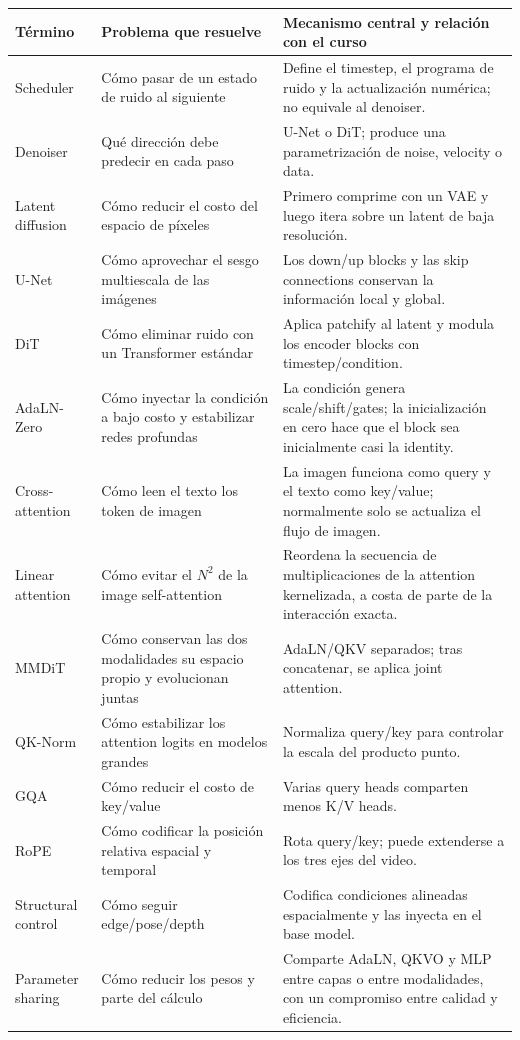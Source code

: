 \documentclass[a4paper]{article}
\begin{document}
\begin{center}
\small
\begin{tabularx}{\textwidth}{p{} X X}
\toprule
\textbf{Término} & \textbf{Problema que resuelve} & \textbf{Mecanismo central y relación con el curso} \\
\midrule
Scheduler & Cómo pasar de un estado de ruido al siguiente & Define el timestep, el programa de ruido y la actualización numérica; no equivale al denoiser. \\
Denoiser & Qué dirección debe predecir en cada paso & U-Net o DiT; produce una parametrización de noise, velocity o data. \\
Latent diffusion & Cómo reducir el costo del espacio de píxeles & Primero comprime con un VAE y luego itera sobre un latent de baja resolución. \\
U-Net & Cómo aprovechar el sesgo multiescala de las imágenes & Los down/up blocks y las skip connections conservan la información local y global. \\
DiT & Cómo eliminar ruido con un Transformer estándar & Aplica patchify al latent y modula los encoder blocks con timestep/condition. \\
AdaLN-Zero & Cómo inyectar la condición a bajo costo y estabilizar redes profundas & La condición genera scale/shift/gates; la inicialización en cero hace que el block sea inicialmente casi la identity. \\
Cross-attention & Cómo leen el texto los token de imagen & La imagen funciona como query y el texto como key/value; normalmente solo se actualiza el flujo de imagen. \\
Linear attention & Cómo evitar el $N^2$ de la image self-attention & Reordena la secuencia de multiplicaciones de la attention kernelizada, a costa de parte de la interacción exacta. \\
MMDiT & Cómo conservan las dos modalidades su espacio propio y evolucionan juntas & AdaLN/QKV separados; tras concatenar, se aplica joint attention. \\
QK-Norm & Cómo estabilizar los attention logits en modelos grandes & Normaliza query/key para controlar la escala del producto punto. \\
GQA & Cómo reducir el costo de key/value & Varias query heads comparten menos K/V heads. \\
RoPE & Cómo codificar la posición relativa espacial y temporal & Rota query/key; puede extenderse a los tres ejes del video. \\
Structural control & Cómo seguir edge/pose/depth & Codifica condiciones alineadas espacialmente y las inyecta en el base model. \\
Parameter sharing & Cómo reducir los pesos y parte del cálculo & Comparte AdaLN, QKVO y MLP entre capas o entre modalidades, con un compromiso entre calidad y eficiencia. \\
\bottomrule
\end{tabularx}
\end{center}
\end{document}

